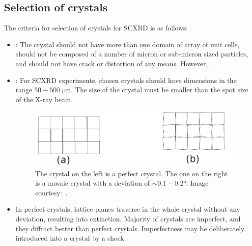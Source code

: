 \subsection{\label{subsec:crystal_selection}Selection of crystals}

The criteria for selection of crystals for SCXRD is as follows:%
%			
	\begin{itemize}%
%			
	    \item {}: The crystal should not have more than one domain of array of unit cells, should not be composed of a number of micron or sub-micron sized particles, and should not have crack or distortion of any means. However, .
	    
	    \item {}: For SCXRD experiments, chosen crystals should have dimensions in the range $50-500~\si{\micro\metre}.$ The size of the crystal must be smaller than the spot size of the X-ray beam.
	    
	    \begin{figure}
	    	\centering
	    	\includegraphics[scale=0.5]{imperfect_crystal.png}
	    	\caption{\label{fig:imperfect_crystal}The crystal on the left is a perfect crystal. The one on the right is a mosaic crystal with a deviation of $\sim 0.1-0.2 \si{\degree}.$ Image courtesy:~\cite{Chowdhury2022}.}
	    \end{figure}
	    
	    \item {} In perfect crystals, lattice planes traverse in the whole crystal without any deviation, resulting into extinction. Majority of crystals are imperfect, and they diffract better than perfect crystals. Imperfectness may be deliberately introduced into a crystal by a shock.
	    

\end{itemize}
